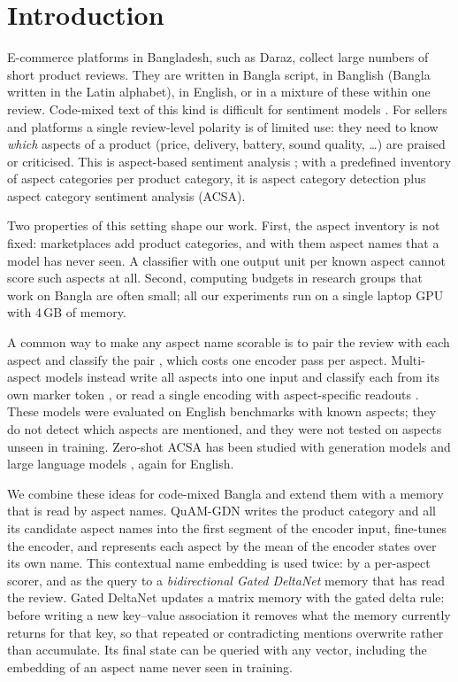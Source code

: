 \documentclass[11pt]{article}
\newcommand{\quam}{QuAM-GDN}
\begin{document}
\section{Introduction}

E-commerce platforms in Bangladesh, such as Daraz, collect large numbers of short product reviews.
They are written in Bangla script, in Banglish (Bangla written in the Latin alphabet), in English, or
in a mixture of these within one review. Code-mixed text of this kind is difficult for sentiment
models \citep{patwa2020sentimix}. For sellers and platforms a single review-level polarity is of
limited use: they need to know \emph{which} aspects of a product (price, delivery, battery, sound
quality, \dots) are praised or criticised. This is aspect-based sentiment analysis
\citep[ABSA;][]{pontiki2014semeval,pontiki2016semeval,zhang2023absasurvey}; with a predefined
inventory of aspect categories per product category, it is aspect category detection plus aspect
category sentiment analysis (ACSA).

Two properties of this setting shape our work. First, the aspect inventory is not fixed: marketplaces
add product categories, and with them aspect names that a model has never seen. A classifier with one
output unit per known aspect cannot score such aspects at all. Second, computing budgets in research
groups that work on Bangla are often small; all our experiments run on a single laptop GPU with
4\,GB of memory.

A common way to make any aspect name scorable is to pair the review with each aspect and classify the
pair \citep{sun2019auxiliary}, which costs one encoder pass per aspect. Multi-aspect models instead
write all aspects into one input and classify each from its own marker token \citep{wu2020tmm}, or
read a single encoding with aspect-specific readouts \citep{xia2026dabs}. These models were evaluated
on English benchmarks with known aspects; they do not detect which aspects are mentioned, and they were
not tested on aspects unseen in training. Zero-shot ACSA has been studied with generation models and
large language models \citep{liu2021acsagen,ventirozos2025zeroshotacsa}, again for English.

We combine these ideas for code-mixed Bangla and extend them with a memory that is read by aspect
names. \quam{} writes the product category and all its candidate aspect names into the first segment
of the encoder input, fine-tunes the encoder, and represents each aspect by the mean of the encoder
states over its own name. This contextual name embedding is used twice: by a per-aspect scorer, and as
the query to a \emph{bidirectional Gated DeltaNet} memory \citep{yang2025gdn} that has read the
review. Gated DeltaNet updates a matrix memory with the gated delta rule: before writing a new
key--value association it removes what the memory currently returns for that key, so that repeated or
contradicting mentions overwrite rather than accumulate. Its final state can be queried with any
vector, including the embedding of an aspect name never seen in training.
\end{document}
